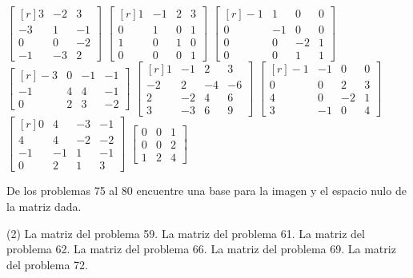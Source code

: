 \begin{tasks}[
    start=55,
    style=enumerate,
    label-offset = 3mm,
    ]
    \task $\begin{bmatrix*}[r]3 & -2 & 3 \\ -3 & 1 & -1 \\ 0 & 0 & -2 \\ -1 & -3 & 2\end{bmatrix*}$
    \task $\begin{bmatrix*}[r]1 & -1 & 2 & 3 \\ 0 & 1 & 0 & 1 \\ 1 & 0 & 1 & 0 \\ 0 & 0 & 0 & 1\end{bmatrix*}$
    \task $\begin{bmatrix*}[r]-1 & 1 & 0 & 0 \\ 0 & -1 & 0 & 0 \\ 0 & 0 & -2 & 1 \\ 0 & 0 & 1 & 1\end{bmatrix*}$
    \task $\begin{bmatrix*}[r]-3 & 0 & -1 & -1 \\ -1 & 4 & 4 & -1 \\ 0 & 2 & 3 & -2\end{bmatrix*}$\newpage
    \task $\begin{bmatrix*}[r]1 & -1 & 2 & 3 \\ -2 & 2 & -4 & -6 \\ 2 & -2 & 4 & 6 \\ 3 & -3 & 6 & 9\end{bmatrix*}$
    \task $\begin{bmatrix*}[r]-1 & -1 & 0 & 0 \\ 0 & 0 & 2 & 3 \\ 4 & 0 & -2 & 1 \\ 3 & -1 & 0 & 4\end{bmatrix*}$
    \task $\begin{bmatrix*}[r]0 & 4 & -3 & -1 \\ 4 & 4 & -2 & -2 \\ -1 & -1 & 1 & -1 \\ 0 & 2 & 1 & 3\end{bmatrix*}$
    \task $\begin{bmatrix*}0 & 0 & 1 \\ 0 & 0 & 2 \\ 1 & 2 & 4\end{bmatrix*}$
\end{tasks}
De los problemas 75 al 80 encuentre una base para la imagen y el espacio nulo de la matriz dada.
\begin{tasks}[
    start=75,
    style=enumerate,
    label-offset = 3mm,
    ](2)
    \task La matriz del problema 59.
    \task La matriz del problema 61.
    \task La matriz del problema 62.
    \task La matriz del problema 66.
    \task La matriz del problema 69.
    \task La matriz del problema 72.
\end{tasks}
